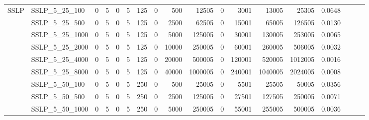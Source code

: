 \begin{table}[h]
{\begin{tabular}{llrrrrrrrrrrrrrlll}
			\multirow{24}{*}{SSLP}      & SSLP\_5\_25\_100             & 0            & 5           & 0          & 5            & 125         & 0          & 500     & 12505    & 0      & 3001    & 13005    & 25305      & 0.0648    &                          &                          &                          \\
			& SSLP\_5\_25\_500             & 0            & 5           & 0          & 5            & 125         & 0          & 2500    & 62505    & 0      & 15001   & 65005    & 126505     & 0.0130    &                          &                          &                          \\
			& SSLP\_5\_25\_1000            & 0            & 5           & 0          & 5            & 125         & 0          & 5000    & 125005   & 0      & 30001   & 130005   & 253005     & 0.0065    &                          &                          &                          \\
			& SSLP\_5\_25\_2000            & 0            & 5           & 0          & 5            & 125         & 0          & 10000   & 250005   & 0      & 60001   & 260005   & 506005     & 0.0032    &                          &                          &                          \\
			& SSLP\_5\_25\_4000            & 0            & 5           & 0          & 5            & 125         & 0          & 20000   & 500005   & 0      & 120001  & 520005   & 1012005    & 0.0016    &                          &                          &                          \\
			& SSLP\_5\_25\_8000            & 0            & 5           & 0          & 5            & 125         & 0          & 40000   & 1000005  & 0      & 240001  & 1040005  & 2024005    & 0.0008    &                          &                          &                          \\
			& SSLP\_5\_50\_100             & 0            & 5           & 0          & 5            & 250         & 0          & 500     & 25005    & 0      & 5501    & 25505    & 50005      & 0.0356    &                          &                          &                          \\
			& SSLP\_5\_50\_500             & 0            & 5           & 0          & 5            & 250         & 0          & 2500    & 125005   & 0      & 27501   & 127505   & 250005     & 0.0071    &                          &                          &                          \\
			& SSLP\_5\_50\_1000            & 0            & 5           & 0          & 5            & 250         & 0          & 5000    & 250005   & 0      & 55001   & 255005   & 500005     & 0.0036    &                          &                          &                          \\

\end{tabular}}
\end{table}
